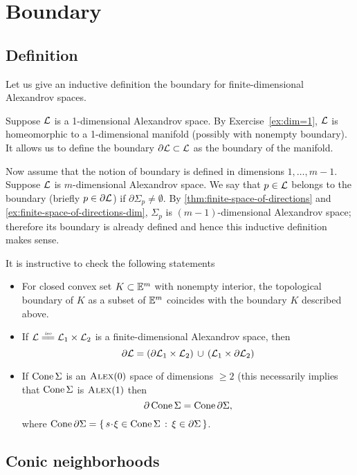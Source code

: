\chapter{Boundary}\label{chap:bry}

\section{Definition}

Let us give an inductive definition the boundary for finite-dimensional Alexandrov spaces.

Suppose $\mathcal{L}$ is a 1-dimensional Alexandrov space.
By Exercise~\ref{ex:dim=1},
$\mathcal{L}$ is homeomorphic to a 1-dimensional manifold (possibly with nonempty boundary).
It allows us to define the boundary $\partial\mathcal{L}\subset \mathcal{L}$ as the boundary of the manifold.

Now assume that the notion of boundary is defined in dimensions $1,\dots,m-1$.
Suppose  $\mathcal{L}$ is $m$-dimensional Alexandrov space.
We say that $p\in \mathcal{L}$ belongs to the boundary (briefly $p\in \partial \mathcal{L}$) if 
$\partial\Sigma_p\ne\emptyset$.
By \ref{thm:finite-space-of-directions} and \ref{ex:finite-space-of-directions-dim}, $\Sigma_p$ is $(m-1)$-dimensional Alexandrov space;
therefore its boundary is already defined and hence this inductive definition makes sense.

It is instructive to check the following statements
\begin{itemize}
\item For closed convex set $K\subset \mathbb{E}^m$ with nonempty interior, the topological boundary of $K$ as a subset of $\mathbb{E}^m$ coincides with the boundary $K$ described above.
\item If $\spc{L}\iso\spc{L}_1\times\spc{L}_2$ is a finite-dimensional Alexandrov space,
then
\[\partial \mathcal{L}=(\partial\mathcal{L}_1\times\mathcal{L}_2)\,\cup\,(\mathcal{L}_1\times\partial\mathcal{L}_2)\]
\item If $\mathop{\rm Cone}\nolimits\Sigma$ is an $\textsc{Alex}(0)$ space of dimensions $\ge 2$  (this necessarily implies that   $\mathop{\rm Cone}\nolimits\Sigma$  is  $\textsc{Alex}(1) $ then
\[\partial \mathop{\rm Cone}\nolimits\Sigma=\mathop{\rm Cone}\nolimits\partial\Sigma,\]
where $\Cone\partial\Sigma=\set{s\cdot \xi\in\Cone\Sigma }{\xi\in \partial\Sigma}$.
\end{itemize}


\section{Conic neighborhoods}

